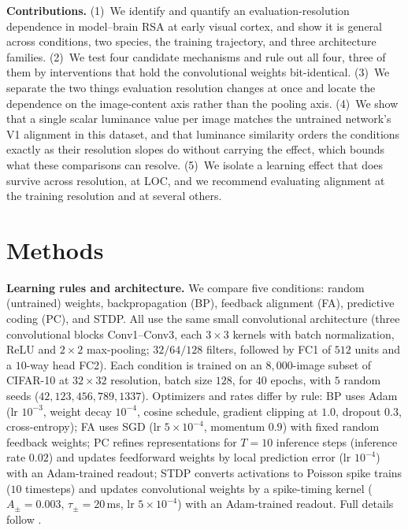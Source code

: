\documentclass[10pt,twocolumn]{article}
\begin{document}
\textbf{Contributions.} (1)~We identify and quantify an evaluation-resolution dependence in model--brain RSA at early visual cortex, and show it is general across conditions, two species, the training trajectory, and three architecture families. (2)~We test four candidate mechanisms and rule out all four, three of them by interventions that hold the convolutional weights bit-identical. (3)~We separate the two things evaluation resolution changes at once and locate the dependence on the image-content axis rather than the pooling axis. (4)~We show that a single scalar luminance value per image matches the untrained network's V1 alignment in this dataset, and that luminance similarity orders the conditions exactly as their resolution slopes do without carrying the effect, which bounds what these comparisons can resolve. (5)~We isolate a learning effect that does survive across resolution, at LOC, and we recommend evaluating alignment at the training resolution and at several others.

\section{Methods}

\textbf{Learning rules and architecture.} We compare five conditions: random (untrained) weights, backpropagation (BP), feedback alignment (FA), predictive coding (PC), and STDP. All use the same small convolutional architecture (three convolutional blocks Conv1--Conv3, each $3\times3$ kernels with batch normalization, ReLU and $2\times2$ max-pooling; $32/64/128$ filters, followed by FC1 of $512$ units and a $10$-way head FC2). Each condition is trained on an $8{,}000$-image subset of CIFAR-10 at $32\times32$ resolution, batch size $128$, for $40$ epochs, with $5$ random seeds ($42, 123, 456, 789, 1337$). Optimizers and rates differ by rule: BP uses Adam (lr $10^{-3}$, weight decay $10^{-4}$, cosine schedule, gradient clipping at $1.0$, dropout $0.3$, cross-entropy); FA uses SGD (lr $5\times10^{-4}$, momentum $0.9$) with fixed random feedback weights; PC refines representations for $T=10$ inference steps (inference rate $0.02$) and updates feedforward weights by local prediction error (lr $10^{-4}$) with an Adam-trained readout; STDP converts activations to Poisson spike trains ($10$ timesteps) and updates convolutional weights by a spike-timing kernel ($A_\pm=0.003$, $\tau_\pm=20$\,ms, lr $5\times10^{-4}$) with an Adam-trained readout. Full details follow \citet{leutenegger2026}.
\end{document}
